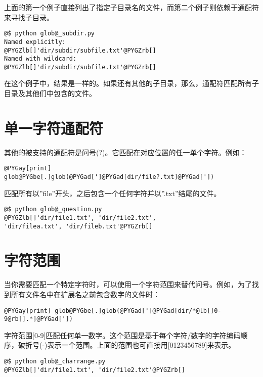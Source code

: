 \documentclass[a4paper,10pt,english]{manual}
\begin{document}
上面的第一个例子直接列出了指定子目录名的文件，而第二个例子则依赖于通配符来寻找子目录。

\begin{Verbatim}[commandchars=@\[\]]
@$ python glob@_subdir.py
Named explicitly:
@PYGZlb[]'dir/subdir/subfile.txt'@PYGZrb[]
Named with wildcard:
@PYGZlb[]'dir/subdir/subfile.txt'@PYGZrb[]
\end{Verbatim}

在这个例子中，结果是一样的。如果还有其他的子目录，那么，通配符匹配所有子目录及其他们中包含的文件。


\section{单一字符通配符}

其他的被支持的通配符是问号(?)。它匹配在对应位置的任一单个字符。例如：

\begin{Verbatim}[commandchars=@\[\]]
@PYGay[print] glob@PYGbe[.]glob(@PYGad[']@PYGad[dir/file?.txt]@PYGad['])
\end{Verbatim}

匹配所有以''file''开头，之后包含一个任何字符并以''.txt''结尾的文件。

\begin{Verbatim}[commandchars=@\[\]]
@$ python glob@_question.py
@PYGZlb[]'dir/file1.txt', 'dir/file2.txt',
'dir/filea.txt', 'dir/fileb.txt'@PYGZrb[]
\end{Verbatim}


\section{字符范围}

当你需要匹配一个特定字符时，可以使用一个字符范围来替代问号。例如，为了找到所有文件名中在扩展名之前包含数字的文件时：

\begin{Verbatim}[commandchars=@\[\]]
@PYGay[print] glob@PYGbe[.]glob(@PYGad[']@PYGad[dir/*@lb[]0-9@rb[].*]@PYGad['])
\end{Verbatim}

字符范围{[}0-9{]}匹配任何单一数字。这个范围是基于每个字符/数字的字符编码顺序，破折号(-)表示一个范围。上面的范围也可直接用{[}0123456789{]}来表示。

\begin{Verbatim}[commandchars=@\[\]]
@$ python glob@_charrange.py
@PYGZlb[]'dir/file1.txt', 'dir/file2.txt'@PYGZrb[]
\end{Verbatim}
\end{document}
